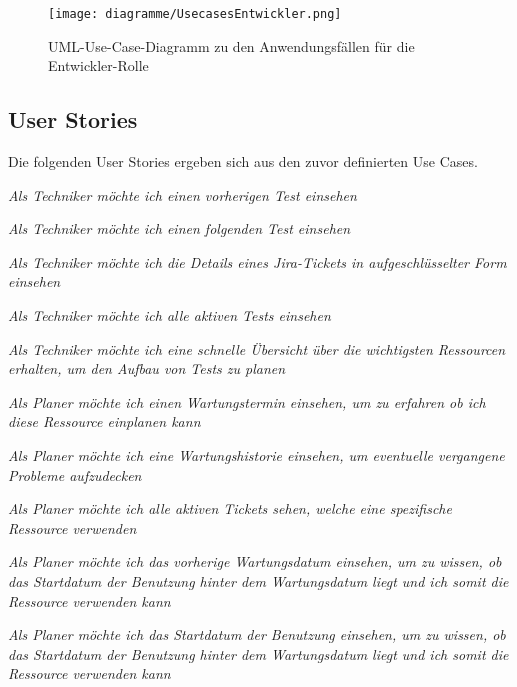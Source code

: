 \begin{figure}[H]
    \texttt{[image: diagramme/UsecasesEntwickler.png]}
    \caption{UML-Use-Case-Diagramm zu den Anwendungsfällen für die Entwickler-Rolle}\label{fig:usecasesEntwickler}
\end{figure}

\subsection{User Stories}\label{sec:userstories}
Die folgenden User Stories ergeben sich aus den zuvor definierten Use Cases.

\begin{description}
    \textit{Als Techniker möchte ich einen vorherigen Test einsehen}

    \textit{Als Techniker möchte ich einen folgenden Test einsehen}

    \textit{Als Techniker möchte ich die Details eines Jira-Tickets in 
    aufgeschlüsselter Form einsehen}

    \textit{Als Techniker möchte ich alle aktiven Tests einsehen}

    \textit{Als Techniker möchte ich eine schnelle Übersicht über die wichtigsten
    Ressourcen erhalten, um den Aufbau von Tests zu planen}

    \textit{Als Planer möchte ich einen Wartungstermin einsehen, um zu erfahren
    ob ich diese Ressource einplanen kann}

    \textit{Als Planer möchte ich eine Wartungshistorie einsehen, um eventuelle
    vergangene Probleme aufzudecken}

    \textit{Als Planer möchte ich alle aktiven Tickets sehen, 
    welche eine spezifische Ressource verwenden}

    \textit{Als Planer möchte ich das vorherige Wartungsdatum einsehen, 
    um zu wissen, ob das Startdatum der Benutzung hinter dem Wartungsdatum liegt
    und ich somit die Ressource verwenden kann}

    \textit{Als Planer möchte ich das Startdatum der Benutzung einsehen,
    um zu wissen, ob das Startdatum der Benutzung hinter dem Wartungsdatum liegt
    und ich somit die Ressource verwenden kann }


\end{description}
